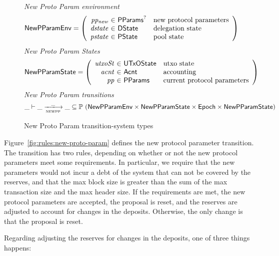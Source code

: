\begin{figure}[htb]
  \emph{New Proto Param environment}
  \begin{equation*}
    \NewPParamEnv =
    \left(
      \begin{array}{r@{~\in~}ll}
        \var{pp_{new}} & \PParams^? & \text{new protocol parameters}\\
        \var{dstate} & \DState & \text{delegation state}\\
        \var{pstate} & \PState & \text{pool state}\\
      \end{array}
    \right)
  \end{equation*}
  \emph{New Proto Param States}
  \begin{equation*}
    \NewPParamState =
    \left(
      \begin{array}{r@{~\in~}ll}
        \var{utxoSt} & \UTxOState & \text{utxo state}\\
        \var{acnt} & \Acnt & \text{accounting}\\
        \var{pp} & \PParams & \text{current protocol parameters}\\
      \end{array}
    \right)
  \end{equation*}
  \emph{New Proto Param transitions}
  \begin{equation*}
    \_ \vdash
    \var{\_} \trans{newpp}{\_} \var{\_}
    \subseteq \powerset (\NewPParamEnv \times \NewPParamState \times \Epoch \times \NewPParamState)
  \end{equation*}
  \caption{New Proto Param transition-system types}
  \label{fig:ts-types:new-proto-param}
\end{figure}


Figure~\ref{fig:rules:new-proto-param} defines the new protocol parameter transition.
The transition has two rules, depending on whether or not the new protocol parameters
meet some requirements.
In particular, we require that the new parameters would not incur a debt of the system that
can not be covered by the reserves, and that the max block size is greater than the sum of the
max transaction size and the max header size.
If the requirements are met, the new protocol parameters are accepted, the proposal is reset,
and the reserves are adjusted to account for changes in the deposits.
Otherwise, the only change is that the proposal is reset.

Regarding adjusting the reserves for changes in the deposits, one of three things happens:

